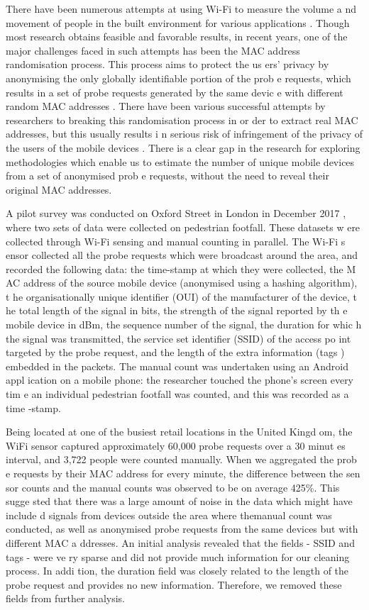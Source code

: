 \documentclass[11t, a4paper, twocolumn]{article}
\begin{document}
	There have been numerous attempts at using Wi-Fi to measure the volume a
nd movement of people in the built environment for various applications \citep{z
arim2006,sap2015,reki2007}. Though most research obtains feasible and favorable 
results, in recent years, one of the major challenges faced in such attempts has
 been the MAC address randomisation process. This process aims to protect the us
ers’ privacy by anonymising the only globally identifiable portion of the prob
e requests, which results in a set of probe requests generated by the same devic
e with different random MAC addresses \citep{green2008}. There have been various
 successful attempts by researchers to breaking this randomisation process in or
der to extract real MAC addresses, \citep{martin2017} but this usually results i
n serious risk of infringement of the privacy of the users of the mobile devices
. There is a clear gap in the research for exploring methodologies which enable 
us to estimate the number of unique mobile devices from a set of anonymised prob
e requests, without the need to reveal their original MAC addresses.

	A pilot survey was conducted on Oxford Street in London in December 2017
, where two sets of data were collected on pedestrian footfall. These datasets w
ere collected through Wi-Fi sensing and manual counting in parallel. The Wi-Fi s
ensor collected all the probe requests which were broadcast around the area, and
 recorded the following data: the time-stamp at which they were collected, the M
AC address of the source mobile device (anonymised using a hashing algorithm), t
he organisationally unique identifier (OUI) of the manufacturer of the device, t
he total length of the signal in bits, the strength of the signal reported by th
e mobile device in dBm, the sequence number of the signal, the duration for whic
h the signal was transmitted, the service set identifier (SSID) of the access po
int targeted by the probe request, and the length of the extra information (tags
) embedded in the packets. The manual count was undertaken using an Android appl
ication on a mobile phone: the researcher touched the phone’s screen every tim
e an individual pedestrian footfall was counted, and this was recorded as a time
-stamp. 

	Being located at one of the busiest retail locations in the United Kingd
om, the WiFi sensor captured approximately 60,000 probe requests over a 30 minut
es interval, and 3,722 people were counted manually. When we aggregated the prob
e requests by their MAC address for every minute, the difference between the sen
sor counts and the manual counts was observed to be on average 425\%. This sugge
sted that there was a large amount of noise in the data which might have include
d signals from devices outside the area where themanual count was conducted, as 
well as anonymised probe requests from the same devices but with different MAC a
ddresses. An initial analysis revealed that the fields - SSID and tags - were ve
ry sparse and did not provide much information for our cleaning process. In addi
tion, the duration field was closely related to the length of the probe request 
and provides no new information. Therefore, we removed these fields from further
 analysis.
\end{document}
